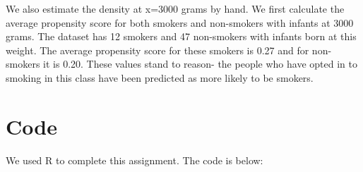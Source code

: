 \documentclass[letterpaper, 12pt]{article}
\begin{document}
We also estimate the density at x=3000 grams by hand. We first calculate the average propensity score for both smokers and non-smokers with infants at 3000 grams. The dataset has 12 smokers and 47 non-smokers with infants born at this weight. The average propensity score for these smokers is 0.27 and for non-smokers it is 0.20. These values stand to reason- the people who have opted in to smoking in this class have been predicted as more likely to be smokers.


\section{Code}
We used R to complete this assignment.  The code is below:


\end{document}
